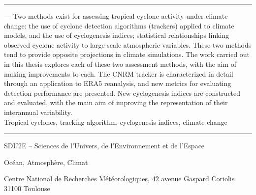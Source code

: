\documentclass[../main.tex]{subfiles}
\begin{document}
\vspace{5mm}
\noindent\rule[2pt]{\textwidth}{0.5pt}
 --- Two methods exist for assessing tropical cyclone activity under climate change: the use of cyclone detection
algorithms (trackers) applied to climate models, and the use of cyclogenesis indices; statistical relationships linking observed cyclone activity to large-scale
atmospheric variables. These two methods tend to provide opposite projections in climate simulations. The work carried out in this thesis explores each of
these two assessment methods, with the aim of making improvements to each. The CNRM tracker is characterized in detail through an application to ERA5
reanalysis, and new metrics for evaluating detection performance are presented. New cyclogenesis indices are constructed and evaluated, with the main aim of
improving the representation of their interannual variability.\\
    Tropical cyclones, tracking algorithm, cyclogenesis indices, climate change
\\
\noindent\rule[2pt]{\textwidth}{0.5pt}

\vspace{1cm}
SDU2E -- Sciences de l'Univers, de l'Environnement et de l'Espace

Océan, Atmosphère, Climat
\\

\vspace{6mm}
\begin{center}
  Centre National de Recherches Météorologiques, 42 avenue Gaspard Coriolis\\
  31100 Toulouse
\end{center}
\end{document}
